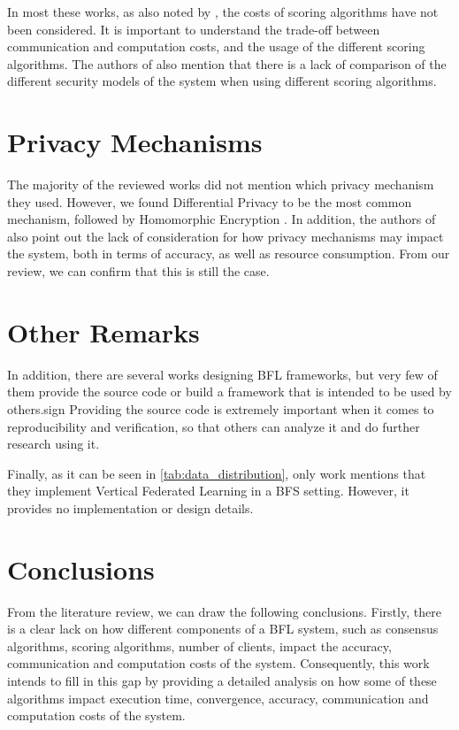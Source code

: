 In most these works, as also noted by \cite{9403374, 10.48550/arxiv.2110.02182}, the costs of scoring algorithms have not been considered. It is important to understand the trade-off between communication and computation costs, and the usage of the different scoring algorithms. The authors of \cite{10.48550/arxiv.2110.02182} also mention that there is a lack of comparison of the different security models of the system when using different scoring algorithms.

\section{Privacy Mechanisms}\label{related_work:privacy}

The majority of the reviewed works did not mention which privacy mechanism they used. However, we found Differential Privacy \cite{10.48550/arxiv.2007.03856, Peyvandi2022, 9170559} to be the most common mechanism, followed by Homomorphic Encryption \cite{8945913, 8894364}. In addition, the authors of \cite{9403374} also point out the lack of consideration for how privacy mechanisms may impact the system, both in terms of accuracy, as well as resource consumption. From our review, we can confirm that this is still the case.

\section{Other Remarks}

In addition, there are several works \cite{10.1145/3422337.3447837, 8945913, 10.48550/arxiv.1910.12603, 10.48550/arxiv.2110.02182} designing BFL frameworks, but very few of them provide the source code or build a framework that is intended to be used by others.sign Providing the source code is extremely important when it comes to reproducibility and verification, so that others can analyze it and do further research using it.

Finally, as it can be seen in \autoref{tab:data_distribution}, only work \cite{10.48550/arxiv.1912.04859} mentions that they implement Vertical Federated Learning in a BFS setting. However, it provides no implementation or design details.

\section{Conclusions}\label{related_work:conclusions}

From the literature review, we can draw the following conclusions. Firstly, there is a clear lack on how different components of a BFL system, such as consensus algorithms, scoring algorithms, number of clients, impact the accuracy, communication and computation costs of the system. Consequently, this work intends to fill in this gap by providing a detailed analysis on how some of these algorithms impact execution time, convergence, accuracy, communication and computation costs of the system.

